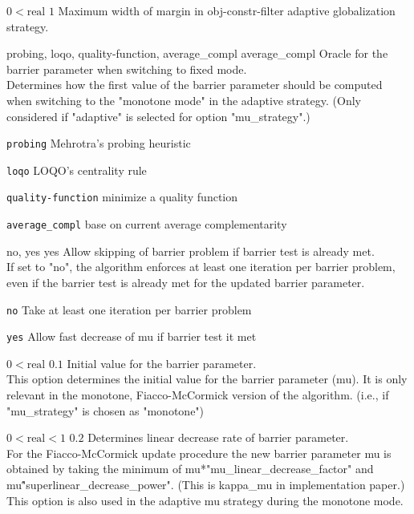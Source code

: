 %
{$0<\textrm{real}$}%
{$1$}%
{Maximum width of margin in obj-constr-filter adaptive globalization strategy.}%
{}

%
{probing, loqo, quality-function, average\_compl}%
{average\_compl}%
{Oracle for the barrier parameter when switching to fixed mode.\\
Determines how the first value of the barrier parameter should be computed when switching to the "monotone mode" in the adaptive strategy. (Only considered if "adaptive" is selected for option "mu\_strategy".)}%
{\begin{list}{}{
\setlength{\parsep}{0em}
\setlength{\leftmargin}{5ex}
\setlength{\labelwidth}{2ex}
\setlength{\itemindent}{0ex}
\setlength{\topsep}{0pt}}
\item[\texttt{probing}] Mehrotra's probing heuristic
\item[\texttt{loqo}] LOQO's centrality rule
\item[\texttt{quality-function}] minimize a quality function
\item[\texttt{average\_compl}] base on current average complementarity
\end{list}
}

%
{no, yes}%
{yes}%
{Allow skipping of barrier problem if barrier test is already met.\\
If set to "no", the algorithm enforces at least one iteration per barrier problem, even if the barrier test is already met for the updated barrier parameter.}%
{\begin{list}{}{
\setlength{\parsep}{0em}
\setlength{\leftmargin}{5ex}
\setlength{\labelwidth}{2ex}
\setlength{\itemindent}{0ex}
\setlength{\topsep}{0pt}}
\item[\texttt{no}] Take at least one iteration per barrier problem
\item[\texttt{yes}] Allow fast decrease of mu if barrier test it met
\end{list}
}

%
{$0<\textrm{real}$}%
{$0.1$}%
{Initial value for the barrier parameter.\\
This option determines the initial value for the barrier parameter (mu).  It is only relevant in the monotone, Fiacco-McCormick version of the algorithm. (i.e., if "mu\_strategy" is chosen as "monotone")}%
{}

%
{$0<\textrm{real}<1$}%
{$0.2$}%
{Determines linear decrease rate of barrier parameter.\\
For the Fiacco-McCormick update procedure the new barrier parameter mu is obtained by taking the minimum of mu*"mu\_linear\_decrease\_factor" and mu\^"superlinear\_decrease\_power".  (This is kappa\_mu in implementation paper.) This option is also used in the adaptive mu strategy during the monotone mode.}%
{}

